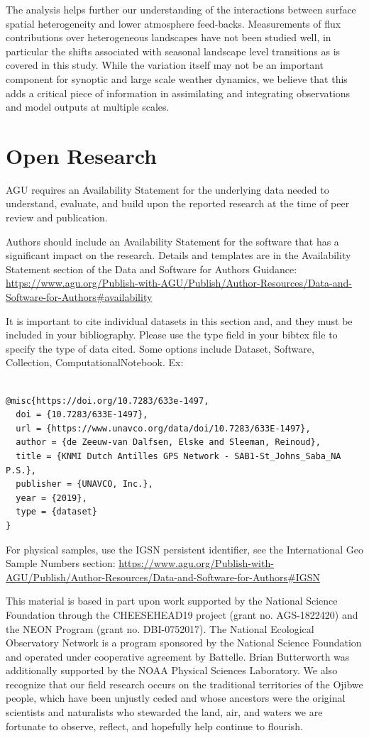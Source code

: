 \documentclass[draft]{agujournal2019}
\begin{document}
The analysis helps further our understanding of the interactions between surface spatial heterogeneity and lower atmosphere feed-backs. Measurements of flux contributions over heterogeneous landscapes have not been studied well, in particular the shifts associated with seasonal landscape level transitions as is covered in this study. While the variation itself may not be an important component for synoptic and large scale weather dynamics, we believe that this adds a critical piece of information in assimilating and integrating observations and model outputs at multiple scales.

\section{Open Research}
AGU requires an Availability Statement for the underlying data needed to understand, evaluate, and build upon the reported research at the time of peer review and publication.

Authors should include an Availability Statement for the software that has a significant impact on the research. Details and templates are in the Availability Statement section of the Data and Software for Authors Guidance: \url{https://www.agu.org/Publish-with-AGU/Publish/Author-Resources/Data-and-Software-for-Authors#availability}

It is important to cite individual datasets in this section and, and they must be included in your bibliography. Please use the type field in your bibtex file to specify the type of data cited. Some options include Dataset, Software, Collection, ComputationalNotebook. Ex: 
\\
\begin{verbatim}

@misc{https://doi.org/10.7283/633e-1497,
  doi = {10.7283/633E-1497},
  url = {https://www.unavco.org/data/doi/10.7283/633E-1497},
  author = {de Zeeuw-van Dalfsen, Elske and Sleeman, Reinoud},
  title = {KNMI Dutch Antilles GPS Network - SAB1-St_Johns_Saba_NA P.S.},
  publisher = {UNAVCO, Inc.},
  year = {2019},
  type = {dataset}
}

\end{verbatim}

For physical samples, use the IGSN persistent identifier, see the International Geo Sample Numbers section:
\url{https://www.agu.org/Publish-with-AGU/Publish/Author-Resources/Data-and-Software-for-Authors#IGSN}

\acknowledgments
This material is based in part upon work supported by the National Science Foundation through the CHEESEHEAD19 project (grant no. AGS-1822420) and the NEON Program (grant no. DBI-0752017). The National Ecological Observatory Network is a program sponsored by the National Science Foundation and operated under cooperative agreement by Battelle. Brian Butterworth was additionally supported by the NOAA Physical Sciences Laboratory. We also recognize that our field research occurs on the traditional territories of the Ojibwe people, which have been unjustly ceded and whose ancestors were the original scientists and naturalists who stewarded the land, air, and waters we are fortunate to observe, reflect, and hopefully help continue to flourish.
\end{document}
